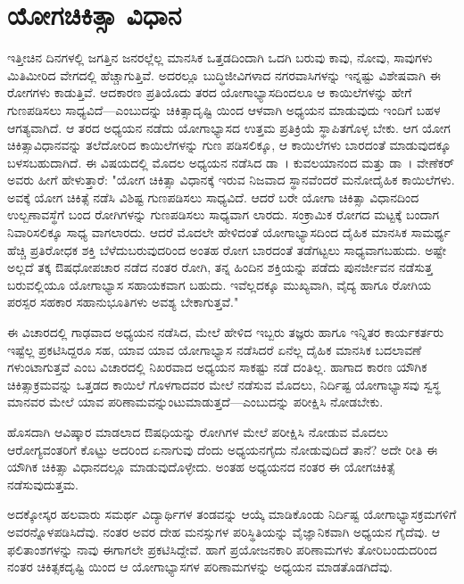 
\chapter{ ಯೋಗಚಿಕಿತ್ಸಾ ವಿಧಾನ}

ಇತ್ತೀಚಿನ ದಿನಗಳಲ್ಲಿ ಜಗತ್ತಿನ ಜನರಲ್ಲೆಲ್ಲ ಮಾನಸಿಕ ಒತ್ತಡದಿಂದಾಗಿ ಒದಗಿ ಬರುವು ಕಾವು, ನೋವು, ಸಾವುಗಳು ಮಿತಿಮೀರಿದ ವೇಗದಲ್ಲಿ ಹೆಚ್ಚಾಗುತ್ತಿವೆ. ಅದರಲ್ಲೂ ಬುದ್ಧಿಜೀವಿಗಳಾದ ನಗರವಾಸಿಗಳನ್ನು ಇನ್ನಷ್ಟು ವಿಶೇಷವಾಗಿ ಈ ರೋಗಗಳು ಕಾಡುತ್ತಿವೆ. ಆದಕಾರಣ ಪ್ರತಿಯೊದು ತರದ ಯೋಗಾಭ್ಯಾಸದಿಂದಲೂ ಆ ಕಾಯಿಲೆಗಳನ್ನು ಹೇಗೆ ಗುಣಪಡಿಸಲು ಸಾಧ್ಯವಿದೆ—ಎಂಬುದನ್ನು ಚಿಕಿತ್ಸಾದೃಷ್ಟಿ ಯಿಂದ ಆಳವಾಗಿ ಅಧ್ಯಯನ ಮಾಡುವುದು ಇಂದಿಗೆ ಬಹಳ ಆಗತ್ಯವಾಗಿದೆ. ಆ ತರದ ಅಧ್ಯಯನ ನಡೆದು ಯೋಗಾಭ್ಯಾಸದ ಉತ್ತಮ ಪ್ರತಿಕ್ರಿಯೆ ಸ್ಥಾಪಿತಗೊಳ್ಳ ಬೇಕು. ಆಗ ಯೋಗ ಚಿಕಿತ್ಸಾವಿಧಾನವನ್ನು ತಲೆದೋರಿದ ಕಾಯಿಲೆಗಳನ್ನು ಗುಣ ಪಡಿಸಲಿಕ್ಕೂ, ಆ ಕಾಯಿಲೆಗಳು ಬಾರದಂತೆ ಮಾಡುವುದಕ್ಕೂ ಬಳಸಬಹುದಾಗಿದೆ. ಈ ವಿಷಯದಲ್ಲಿ ಮೊದಲ ಅಧ್ಯಯನ ನಡೆಸಿದ ಡಾ~। ಕುವಲಯಾನಂದ ಮತ್ತು ಡಾ~। ವೇಣೆಕರ್ ಅವರು ಹೀಗೆ ಹೇಳುತ್ತಾರೆ: "ಯೋಗ ಚಿಕಿತ್ಸಾ ವಿಧಾನಕ್ಕೆ ಇರುವ ನಿಜವಾದ ಸ್ಥಾನವೆಂದರೆ ಮನೋದೈಹಿಕ ಕಾಯಿಲೆಗಳು. ಅವಕ್ಕೆ ಯೋಗ ಚಿಕಿತ್ಸೆ ನಡೆಸಿ ವಿಶಿಷ್ಟ ಗುಣಪಡಿಸಲು ಸಾಧ್ಯವಿದೆ. ಆದರೆ ಬರೇ ಯೋಗಾ ಚಿಕಿತ್ಸಾ ವಿಧಾನದಿಂದ ಉಲ್ಬಣಾವಸ್ಥೆಗೆ ಬಂದ ರೋಗಿಗಳನ್ನು ಗುಣಪಡಿಸಲು ಸಾಧ್ಯವಾಗ ಲಾರದು. ಸಂಕ್ರಾಮಿಕ ರೋಗದ ಮಟ್ಟಕ್ಕೆ ಬಂದಾಗ ನಿವಾರಿಸಲಿಕ್ಕೂ ಸಾಧ್ಯ ವಾಗಲಾರದು. ಆದರೆ ಮೊದಲೇ ಹೇಳಿದಂತೆ ಯೋಗಾಭ್ಯಾಸದಿಂದ ದೈಹಿಕ ಮಾನಸಿಕ ಸಾಮರ್ಥ್ಯ ಹೆಚ್ಚಿ ಪ್ರತಿರೋಧಕ ಶಕ್ತಿ ಬೆಳೆದುಬರುವುದರಿಂದ ಅಂತಹ ರೋಗ ಬಾರದಂತೆ ತಡೆಗಟ್ಟಲು ಸಾಧ್ಯವಾಗಬಹುದು. ಅಷ್ಟೇ ಅಲ್ಲದೆ ತಕ್ಕ ಔಷಧೋಪಚಾರ ನಡೆದ ನಂತರ ರೋಗಿ, ತನ್ನ ಹಿಂದಿನ ಶಕ್ತಿಯನ್ನು ಪಡೆದು ಪುನರ್ಜೀವನ ನಡೆಸುತ್ತ ಬರುವಲ್ಲಿಯೂ ಯೋಗಾಭ್ಯಾಸ ಸಹಾಯಕವಾಗ ಬಹುದು. ಇವೆಲ್ಲದಕ್ಕೂ ಮುಖ್ಯವಾಗಿ, ವೈದ್ಯ ಹಾಗೂ ರೋಗಿಯ ಪರಸ್ಪರ ಸಹಕಾರ ಸಹಾನುಭೂತಿಗಳು ಅವಶ್ಯ ಬೇಕಾಗುತ್ತವೆ."

ಈ ವಿಚಾರದಲ್ಲಿ ಗಾಢವಾದ ಅಧ್ಯಯನ ನಡೆಸಿದ, ಮೇಲೆ ಹೇಳಿದ ಇಬ್ಬರು ತಜ್ಞರು ಹಾಗೂ ಇನ್ನಿತರ ಕಾರ್ಯಕರ್ತರು ಇಷ್ಟೆಲ್ಲ ಪ್ರಕಟಿಸಿದ್ದರೂ ಸಹ, ಯಾವ ಯಾವ ಯೋಗಾಭ್ಯಾಸ ನಡೆಸಿದರೆ ಏನೆಲ್ಲ ದೈಹಿಕ ಮಾನಸಿಕ ಬದಲಾವಣೆ ಗಳುಂಟಾಗುತ್ತವೆ ಎಂಬ ವಿಚಾರದಲ್ಲಿ ನಿಖರವಾದ ಅಧ್ಯಯನ ಸಾಕಷ್ಟು ನಡೆ ದಂತಿಲ್ಲ. ಹಾಗಾದ ಕಾರಣ ಯೌಗಿಕ ಚಿಕಿತ್ಸಾಕ್ರಮವನ್ನು ಒತ್ತಡದ ಕಾಯಿಲೆ ಗೊಳಗಾದವರ ಮೇಲೆ ನಡೆಸುವ ಮೊದಲು, ನಿರ್ದಿಷ್ಟ ಯೋಗಾಭ್ಯಾಸವು ಸ್ವಸ್ಥ ಮಾನವರ ಮೇಲೆ ಯಾವ ಪರಿಣಾಮವನ್ನುಂಟುಮಾಡುತ್ತದೆ—ಎಂಬುದನ್ನು ಪರೀಕ್ಷಿಸಿ ನೋಡಬೇಕು.

ಹೊಸದಾಗಿ ಆವಿಷ್ಕಾರ ಮಾಡಲಾದ ಔಷಧಿಯನ್ನು ರೋಗಿಗಳ ಮೇಲೆ ಪರೀಕ್ಷಿಸಿ ನೋಡುವ ಮೊದಲು ಆರೋಗ್ಯವಂತರಿಗೆ ಕೊಟ್ಟು ಅದರಿಂದ ಏನಾಗುವು ದೆಂದು ಅಧ್ಯಯನಗೈದು ನೋಡುವುದಿದೆ ತಾನೆ? ಅದೇ ರೀತಿ ಈ ಯೌಗಿಕ ಚಿಕಿತ್ಸಾ ವಿಧಾನದಲ್ಲೂ ಮಾಡುವುದೊಳ್ಳೇದು. ಅಂತಹ ಅಧ್ಯಯನದ ನಂತರ ಈ ಯೋಗಚಿಕಿತ್ಸೆ ನಡೆಸುವುದುತ್ತಮ.

ಅದಕ್ಕೋಸ್ಕರ ಹಲವಾರು ಸಮರ್ಥ ವಿದ್ಯಾರ್ಥಿಗಳ ತಂಡವನ್ನು ಆಯ್ಕೆ ಮಾಡಿಕೊಂಡು ನಿರ್ದಿಷ್ಟ ಯೋಗಾಭ್ಯಾಸಕ್ರಮಗಳಿಗೆ ಅವರನ್ನೊಳಪಡಿಸಿದೆವು. ನಂತರ ಅವರ ದೇಹ ಮನಸ್ಸುಗಳ ಪರಿಸ್ಥಿತಿಯನ್ನು ವೈಜ್ಞಾನಿಕವಾಗಿ ಅಧ್ಯಯನ ಗೈದೆವು. ಆ ಫಲಿತಾಂಶಗಳನ್ನು ನಾವು ಈಗಾಗಲೇ ಪ್ರಕಟಿಸಿದ್ದೇವೆ. ಹಾಗೆ ಪ್ರಯೋಜನಕಾರಿ ಪರಿಣಾಮಗಳು ತೋರಿಬಂದುದರಿಂದ ನಂತರ ಚಿಕಿತ್ಸಕದೃಷ್ಟಿ ಯಿಂದ ಆ ಯೋಗಾಭ್ಯಾಸಗಳ ಪರಿಣಾಮಗಳನ್ನು ಅಧ್ಯಯನ ಮಾಡತೊಡಗಿದೆವು.


